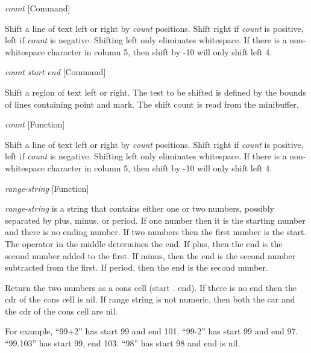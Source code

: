 \vspace{1em}
\noindent
{}
\usebox{\funcname}\emph{count}
 \hfill [Command]

\begin{doc-string}
Shift a line of text left or right by \emph{count} positions.  Shift right
if \emph{count} is positive, left if \emph{count} is negative.  Shifting left only
eliminates whitespace.  If there is a non-whitespace character in column
5, then shift by -10 will only shift left 4.
\end{doc-string}

\vspace{1em}
\noindent
{}
\usebox{\funcname}\emph{count} \emph{start} \emph{end}
 \hfill [Command]

\begin{doc-string}
Shift a region of text left or right.  The test to be shifted is defined
by the bounds of lines containing point and mark.  The shift count is
read from the minibuffer.
\end{doc-string}

\vspace{1em}
\noindent
{}
\usebox{\funcname}\emph{count}
 \hfill [Function]

\begin{doc-string}
Shift a line of text left or right by \emph{count} positions.  Shift right
if \emph{count} is positive, left if \emph{count} is negative.  Shifting left only
eliminates whitespace.  If there is a non-whitespace character in column
5, then shift by -10 will only shift left 4.
\end{doc-string}

\vspace{1em}
\noindent
{}
\usebox{\funcname}\emph{range-string}
 \hfill [Function]

\begin{doc-string}
\emph{range-string} is a string that contains either one or two numbers, possibly
separated by plus, minus, or period.  If one number then it is the starting number
and there is no ending number.  If two numbers then the first number is the start.
The operator in the middle determines the end.  If plus, then the end is the
second number added to the first.  If minus, then the end is the second number
subtracted from the first.  If period, then the end is the second number.

Return the two numbers as a cons cell (start . end).  If there is no end then the
cdr of the cons cell is nil.  If range string is not numeric, then both the car
and the cdr of the cons cell are nil.

For example, ``99+2'' has start 99 and end 101.  ``99-2'' has start 99 and end 97.
``99.103'' has start 99, end 103.  ``98'' has start 98 and end is nil.
\end{doc-string}

